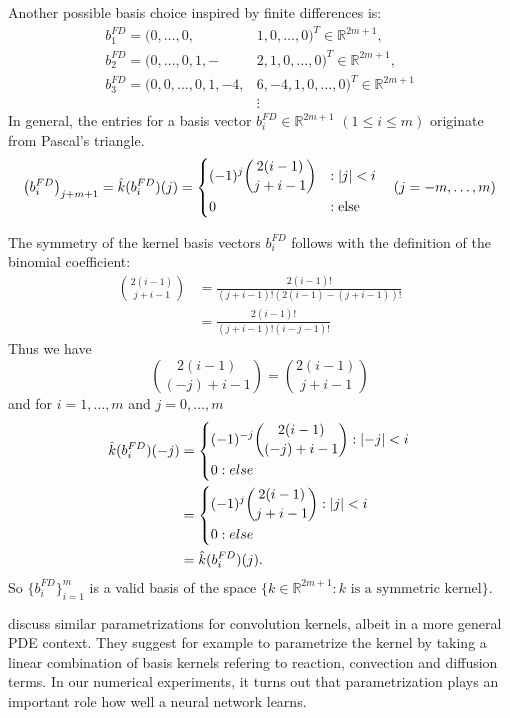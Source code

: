 \documentclass[twoside,a4paper]{article}
\begin{document}
Another possible basis choice inspired by finite differences is:
\begin{align*}
	b_1^{FD} = (0, \dots, 0,& 1,0, \dots, 0)^T \in \mathbb{R}^{2m+1},\\
	b_2^{FD} = (0, \dots, 0, 1,-&2,1, 0, \dots, 0)^T \in \mathbb{R}^{2m+1},\\
	b_3^{FD} = (0, 0, \dots, 0, 1,-4,& 6,-4,1, 0, \dots, 0)^T \in \mathbb{R}^{2m+1} \\
	&\vdots
\end{align*}
In general, the entries for a basis vector $b_i^{FD} \in \mathbb{R}^{2m+1}$ $(1 \leq i \leq m)$ 
originate from Pascal's triangle.
\begin{equation*}
	\left( b_i^{FD} \right)_{j+m+1} = \hat{k}(b_i^{FD})(j) = \begin{dcases}
		(-1)^j \binom{2(i-1)}{j+i-1} &: \left|{j}\right| < i \\
		0 &: \text{else}
	\end{dcases}
	\quad (j=-m, \dots, m)
\end{equation*}

The symmetry of the kernel basis vectors $b_i^{FD}$ follows with the definition of the binomial coefficient:
\begin{align*}
	\binom{2(i-1)}{j+i-1} &= \frac{2(i-1)!}{(j+i-1)!(2(i-1)-(j+i-1))!} \\
	&= \frac{2(i-1)!}{(j+i-1)!(i-j-1)!}
\end{align*}
Thus we have
\begin{equation*}
	\binom{2(i-1)}{(-j)+i-1} = \binom{2(i-1)}{j+i-1}
\end{equation*}
and for $i=1, \dots, m$ and $j= 0, \dots, m$
\begin{align*}
	\hat{k}(b_i^{FD})(-j) &= \begin{dcases}
		(-1)^{-j} \binom{2(i-1)}{(-j)+i-1} : \left|{-j}\right| < i \\
		0 : else
	\end{dcases} \\
	&= \begin{dcases}
		(-1)^{j} \binom{2(i-1)}{j+i-1} : \left|{j}\right| < i \\
		0 : else
	\end{dcases} \\
	&= \hat{k}(b_i^{FD})(j)
	.
\end{align*}
So $\{ b_i^{FD} \}_{i=1}^m$ is a valid basis of
the space $\{ k \in \mathbb{R}^{2m+1} : k \text{ is a symmetric kernel} \}$.

\citet{Ruthotto2020} discuss similar parametrizations for
convolution kernels, albeit in a more general PDE context. They
suggest for example to parametrize the kernel by taking a linear combination
of basis kernels refering to reaction, convection and diffusion terms.
In our numerical experiments, it turns out that
parametrization plays an important role how well a neural network learns.
\end{document}

